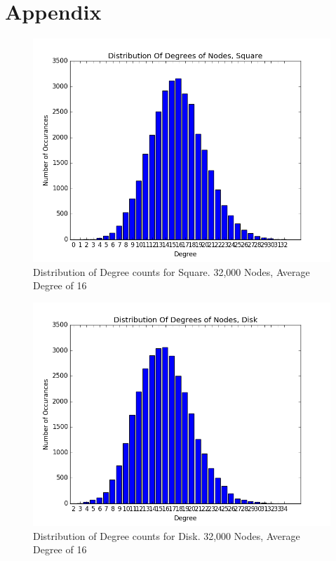 \documentclass{article}
\begin{document}
\newpage

\section{Appendix}

\begin{figure}[h]
    \centering
        \includegraphics[scale=0.6]{./graphs/hist_deg_square.png}
        \caption{Distribution of Degree counts for Square. 32,000 Nodes, Average Degree of 16}
        \label{squaredeghist}
\end{figure}

\begin{figure}
    \centering
    \includegraphics[scale=0.6]{./graphs/hist_deg_disk.png}
    \caption{Distribution of Degree counts for Disk. 32,000 Nodes, Average Degree of 16}
    \label{diskdeghist}
\end{figure}
\end{document}
